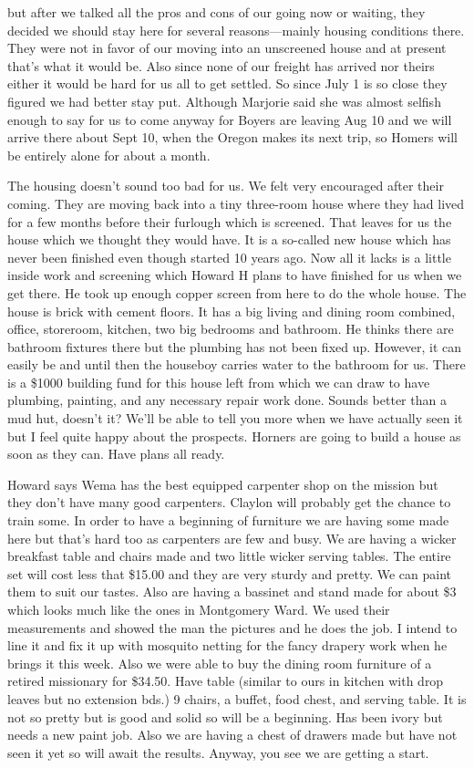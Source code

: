 \documentclass[
]{book}
\begin{document}
but after we talked all the pros and cons of our going now or waiting, they decided we should stay here for several reasons---mainly housing conditions there. They were not in favor of our moving into an unscreened house and at present that's what it would be. Also since none of our freight has arrived nor theirs either it would be hard for us all to get settled. So since July 1 is so close they figured we had better stay put. Although Marjorie said she was almost selfish enough to say for us to come anyway for Boyers are leaving Aug 10 and we will arrive there about Sept 10, when the Oregon makes its next trip, so Homers will be entirely alone for about a month.

The housing doesn't sound too bad for us. We felt very encouraged after their coming. They are moving back into a tiny three-room house where they had lived for a few months before their furlough which is screened. That leaves for us the house which we thought they would have. It is a so-called new house which has never been finished even though started 10 years ago. Now all it lacks is a little inside work and screening which Howard H plans to have finished for us when we get there. He took up enough copper screen from here to do the whole house. The house is brick with cement floors. It has a big living and dining room combined, office, storeroom, kitchen, two big bedrooms and bathroom. He thinks there are bathroom fixtures there but the plumbing has not been fixed up. However, it can easily be and until then the houseboy carries water to the bathroom for us. There is a \$1000 building fund for this house left from which we can draw to have plumbing, painting, and any necessary repair work done. Sounds better than a mud hut, doesn't it? We'll be able to tell you more when we have actually seen it but I feel quite happy about the prospects. Horners are going to build a house as soon as they can. Have plans all ready.

Howard says Wema has the best equipped carpenter shop on the mission but they don't have many good carpenters. Claylon will probably get the chance to train some. In order to have a beginning of furniture we are having some made here but that's hard too as carpenters are few and busy. We are having a wicker breakfast table and chairs made and two little wicker serving tables. The entire set will cost less that \$15.00 and they are very sturdy and pretty. We can paint them to suit our tastes. Also are having a bassinet and stand made for about \$3 which looks much like the ones in Montgomery Ward. We used their measurements and showed the man the pictures and he does the job. I intend to line it and fix it up with mosquito netting for the fancy drapery work when he brings it this week. Also we were able to buy the dining room furniture of a retired missionary for \$34.50. Have table (similar to ours in kitchen with drop leaves but no extension bds.) 9 chairs, a buffet, food chest, and serving table. It is not so pretty but is good and solid so will be a beginning. Has been ivory but needs a new paint job. Also we are having a chest of drawers made but have not seen it yet so will await the results. Anyway, you see we are getting a start.
\end{document}
